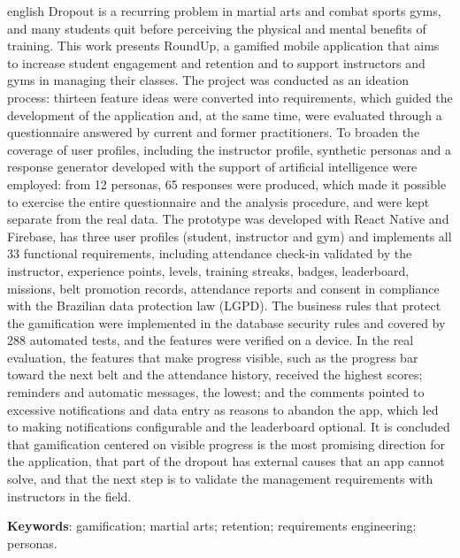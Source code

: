 \begin{resumo}[Abstract]
\begin{otherlanguage*}{english}
\SingleSpacing
\noindent Dropout is a recurring problem in martial arts and combat sports
gyms, and many students quit before perceiving the physical and mental
benefits of training. This work presents RoundUp, a gamified mobile
application that aims to increase student engagement and retention and to
support instructors and gyms in managing their classes. The project was
conducted as an ideation process: thirteen feature ideas were converted
into requirements, which guided the development of the application and,
at the same time, were evaluated through a questionnaire answered by current
and former practitioners. To broaden the coverage of user profiles,
including the instructor profile, synthetic personas and a response
generator developed with the support of artificial intelligence were
employed: from 12 personas, 65 responses were produced, which made it
possible to exercise the entire questionnaire and the analysis procedure,
and were kept separate from the real data. The prototype was developed with React Native and Firebase, has
three user profiles (student, instructor and gym) and implements all 33 functional requirements, including attendance check-in validated by
the instructor, experience points, levels, training streaks, badges,
leaderboard, missions, belt promotion records, attendance reports and
consent in compliance with the Brazilian data protection law (LGPD). The
business rules that protect the gamification were implemented in the
database security rules and covered by 288 automated tests, and the
features were verified on a device. In the real
evaluation, the features that make progress visible, such as the progress
bar toward the next belt and the attendance history, received the highest
scores; reminders and automatic messages, the lowest; and the comments
pointed to excessive notifications and data entry as reasons to abandon
the app, which led to making notifications configurable and the
leaderboard optional. It is concluded that gamification centered on
visible progress is the most promising direction for the application,
that part of the dropout has external causes that an app cannot solve,
and that the next step is to validate the management requirements with
instructors in the field.

\vspace{\onelineskip}
\noindent\textbf{Keywords}: gamification; martial arts; retention; requirements engineering; personas.
\end{otherlanguage*}
\end{resumo}
